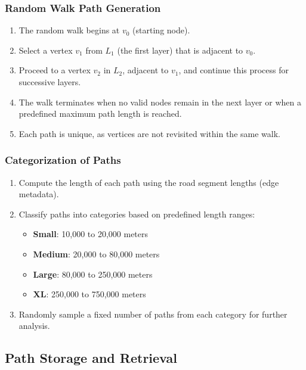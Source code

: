 \documentclass[sigplan,screen]{acmart}
\begin{document}
\subsubsection{Random Walk Path Generation}
\begin{enumerate}
    \item The random walk begins at $v_0$ (starting node).
    \item Select a vertex $v_1$ from $L_1$ (the first layer) that is adjacent to $v_0$.
    \item Proceed to a vertex $v_2$ in $L_2$, adjacent to $v_1$, and continue this process for successive layers.
    \item The walk terminates when no valid nodes remain in the next layer or when a predefined maximum path length is reached.
    \item Each path is unique, as vertices are not revisited within the same walk.
\end{enumerate}

\subsubsection{Categorization of Paths}
\begin{enumerate}
    \item Compute the length of each path using the road segment lengths (edge metadata).
    \item Classify paths into categories based on predefined length ranges:
    \begin{itemize}
        \item \textbf{Small}: 10,000 to 20,000 meters
        \item \textbf{Medium}: 20,000 to 80,000 meters
        \item \textbf{Large}: 80,000 to 250,000 meters
        \item \textbf{XL}: 250,000 to 750,000 meters
    \end{itemize}
    \item Randomly sample a fixed number of paths from each category for further analysis.
\end{enumerate}

\subsection{Path Storage and Retrieval}
\end{document}
